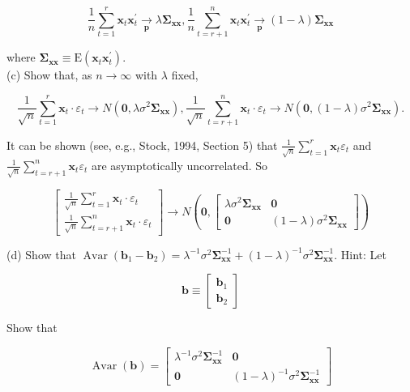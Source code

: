 \documentclass[10pt]{article}
\begin{document}
$$
\frac{1}{n} \sum_{t=1}^{r} \mathbf{x}_{t} \mathbf{x}_{t}^{\prime} \underset{\mathbf{p}}{\rightarrow} \lambda \boldsymbol{\Sigma}_{\mathbf{x x}}, \frac{1}{n} \sum_{t=r+1}^{n} \mathbf{x}_{t} \mathbf{x}_{t}^{\prime} \underset{\mathbf{p}}{\rightarrow}(1-\lambda) \boldsymbol{\Sigma}_{\mathbf{x x}}
$$

where $\boldsymbol{\Sigma}_{\mathbf{x x}} \equiv \mathrm{E}\left(\mathbf{x}_{t} \mathbf{x}_{t}^{\prime}\right)$.\\
(c) Show that, as $n \rightarrow \infty$ with $\lambda$ fixed,

$$
\frac{1}{\sqrt{n}} \sum_{t=1}^{r} \mathbf{x}_{t} \cdot \varepsilon_{t} \rightarrow N\left(\mathbf{0}, \lambda \sigma^{2} \boldsymbol{\Sigma}_{\mathbf{x x}}\right), \frac{1}{\sqrt{n}} \sum_{t=r+1}^{n} \mathbf{x}_{t} \cdot \varepsilon_{t} \rightarrow N\left(\mathbf{0},(1-\lambda) \sigma^{2} \boldsymbol{\Sigma}_{\mathbf{x x}}\right) .
$$

It can be shown (see, e.g., Stock, 1994, Section 5) that $\frac{1}{\sqrt{n}} \sum_{t=1}^{r} \mathbf{x}_{t} \varepsilon_{t}$ and $\frac{1}{\sqrt{n}} \sum_{t=r+1}^{n} \mathbf{x}_{t} \varepsilon_{t}$ are asymptotically uncorrelated. So

$$
\left[\begin{array}{c}
\frac{1}{\sqrt{n}} \sum_{t=1}^{r} \mathbf{x}_{t} \cdot \varepsilon_{t} \\
\frac{1}{\sqrt{n}} \sum_{t=r+1}^{n} \mathbf{x}_{t} \cdot \varepsilon_{t}
\end{array}\right] \rightarrow N\left(\mathbf{0},\left[\begin{array}{cc}
\lambda \sigma^{2} \boldsymbol{\Sigma}_{\mathbf{x} \mathbf{x}} & \mathbf{0} \\
\mathbf{0} & (1-\lambda) \sigma^{2} \mathbf{\Sigma}_{\mathbf{x x}}
\end{array}\right]\right)
$$

(d) Show that $\operatorname{Avar}\left(\mathbf{b}_{1}-\mathbf{b}_{2}\right)=\lambda^{-1} \sigma^{2} \boldsymbol{\Sigma}_{\mathbf{x x}}^{-1}+(1-\lambda)^{-1} \sigma^{2} \boldsymbol{\Sigma}_{\mathbf{x x}}^{-1}$. Hint: Let

$$
\mathbf{b} \equiv\left[\begin{array}{l}
\mathbf{b}_{1} \\
\mathbf{b}_{2}
\end{array}\right]
$$

Show that

$$
\operatorname{Avar}(\mathbf{b})=\left[\begin{array}{cc}
\lambda^{-1} \sigma^{2} \boldsymbol{\Sigma}_{\mathbf{x x}}^{-1} & \mathbf{0} \\
\mathbf{0} & (1-\lambda)^{-1} \sigma^{2} \boldsymbol{\Sigma}_{\mathbf{x x}}^{-1}
\end{array}\right]
$$
\end{document}
